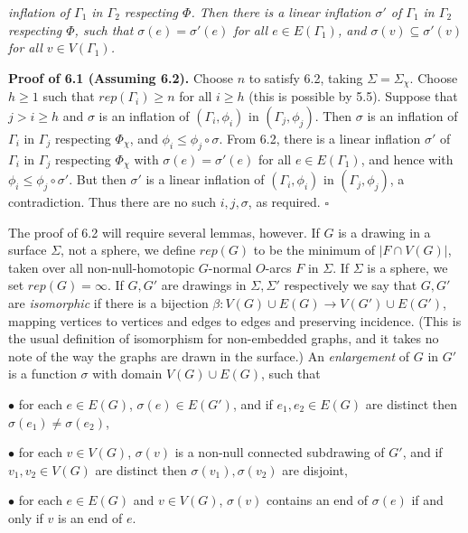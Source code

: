 \noindent \textit{inflation of $\Gamma_1$ in $\Gamma_2$ respecting $\Phi$. Then there is a linear inflation $\sigma'$ of $\Gamma_1$ in $\Gamma_2$ respecting $\Phi$, such that $\sigma(e) = \sigma'(e)$ for all $e \in E(\Gamma_1)$, and $\sigma(v) \subseteq \sigma'(v)$ for all $v \in V(\Gamma_1)$.}

\textbf{Proof of 6.1 (Assuming 6.2).} Choose $n$ to satisfy 6.2, taking $\Sigma = \Sigma_\chi$. Choose $h \ge 1$ such that $rep(\Gamma_i) \ge n$ for all $i \ge h$ (this is possible by 5.5). Suppose that $j > i \ge h$ and $\sigma$ is an inflation of $(\Gamma_i, \phi_i)$ in $(\Gamma_j, \phi_j)$. Then $\sigma$ is an inflation of $\Gamma_i$ in $\Gamma_j$ respecting $\Phi_\chi$, and $\phi_i \le \phi_j \circ \sigma$. From 6.2, there is a linear inflation $\sigma'$ of $\Gamma_i$ in $\Gamma_j$ respecting $\Phi_\chi$ with $\sigma(e) = \sigma'(e)$ for all $e \in E(\Gamma_1)$, and hence with $\phi_i \le \phi_j \circ \sigma'$. But then $\sigma'$ is a linear inflation of $(\Gamma_i, \phi_i)$ in $(\Gamma_j, \phi_j)$, a contradiction. Thus there are no such $i, j, \sigma$, as required. $\square$

The proof of 6.2 will require several lemmas, however. If $G$ is a drawing in a surface $\Sigma$, not a sphere, we define $rep(G)$ to be the minimum of $|F \cap V(G)|$, taken over all non-null-homotopic $G$-normal $O$-arcs $F$ in $\Sigma$. If $\Sigma$ is a sphere, we set $rep(G) = \infty$. If $G, G'$ are drawings in $\Sigma, \Sigma'$ respectively we say that $G, G'$ are \textit{isomorphic} if there is a bijection $\beta : V(G) \cup E(G) \to V(G') \cup E(G')$, mapping vertices to vertices and edges to edges and preserving incidence. (This is the usual definition of isomorphism for non-embedded graphs, and it takes no note of the way the graphs are drawn in the surface.) An \textit{enlargement} of $G$ in $G'$ is a function $\sigma$ with domain $V(G) \cup E(G)$, such that

\hspace*{12pt}$\bullet$ for each $e \in E(G)$, $\sigma(e) \in E(G')$, and if $e_1, e_2 \in E(G)$ are distinct then $\sigma(e_1) \ne \sigma(e_2)$,

\hspace*{12pt}$\bullet$ for each $v \in V(G)$, $\sigma(v)$ is a non-null connected subdrawing of $G'$, and if $v_1, v_2 \in V(G)$ are distinct then $\sigma(v_1), \sigma(v_2)$ are disjoint,

\hspace*{12pt}$\bullet$ for each $e \in E(G)$ and $v \in V(G)$, $\sigma(v)$ contains an end of $\sigma(e)$ if and only if $v$ is an end of $e$.

